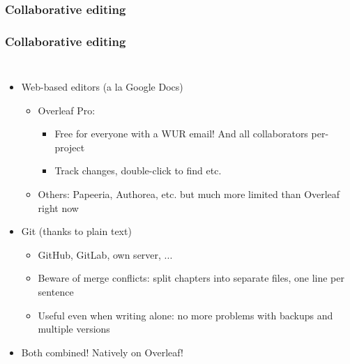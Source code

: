 \documentclass[xetex,colorlinks]{beamer} %
\begin{document}
  \subsubsection{Collaborative editing}
  \begin{frame}
    \frametitle{Collaborative editing}
    \begin{columns}
      \begin{itemize}
	\item Web-based editors (a la Google Docs)
	\begin{itemize}
	  \item Overleaf Pro:
	  \begin{itemize}
	    \item Free for everyone with a WUR email! And all collaborators per-project
	    \item Track changes, double-click to find etc.
	  \end{itemize}
	  \item Others: Papeeria, Authorea, etc. but much more limited than Overleaf right now
	\end{itemize}
	\item Git (thanks to plain text)
	\begin{itemize}
	  \item GitHub, GitLab, own server, ...
	  \item Beware of merge conflicts: split chapters into separate files, one line per sentence
	  \item Useful even when writing alone: no more problems with backups and multiple versions
	\end{itemize}
	\item Both combined! Natively on Overleaf!
      \end{itemize}
      
    \end{columns}
  \end{frame}
  
\end{document}
